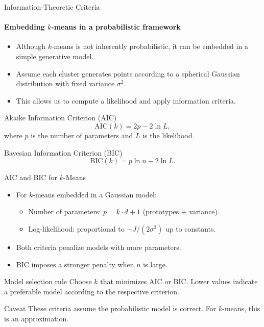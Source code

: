 \begin{frame}{Information-Theoretic Criteria}
  \framesubtitle{Embedding $k$-means in a probabilistic framework}
  \begin{itemize}
    \item Although $k$-means is not inherently probabilistic, it can be embedded in a
          simple generative model.
    \item Assume each cluster generates points according to a spherical Gaussian distribution
          with fixed variance $\sigma^2$.
    \item This allows us to compute a \alert{likelihood} and apply information criteria.
  \end{itemize}
  \begin{block}{Akaike Information Criterion (AIC)}
    \[
    \text{AIC}(k) = 2p - 2\ln L,
    \]
    where $p$ is the number of parameters and $L$ is the likelihood.
  \end{block}
  \begin{block}{Bayesian Information Criterion (BIC)}
    \[
    \text{BIC}(k) = p\ln n - 2\ln L.
    \]
  \end{block}
\end{frame}

\begin{frame}{AIC and BIC for $k$-Means}
  \begin{itemize}
    \item For $k$-means embedded in a Gaussian model:
      \begin{itemize}
        \item Number of parameters: $p = k \cdot d + 1$ (prototypes + variance).
        \item Log-likelihood: proportional to $-J/(2\sigma^2)$ up to constants.
      \end{itemize}
    \item Both criteria penalize models with more parameters.
    \item \alert{BIC} imposes a stronger penalty when $n$ is large.
  \end{itemize}
  \begin{block}{Model selection rule}
    Choose $k$ that \alert{minimizes} AIC or BIC. Lower values indicate a preferable model
    according to the respective criterion.
  \end{block}
  \begin{alertblock}{Caveat}
    These criteria assume the probabilistic model is correct. For $k$-means, this is an
    approximation.
  \end{alertblock}
\end{frame}

